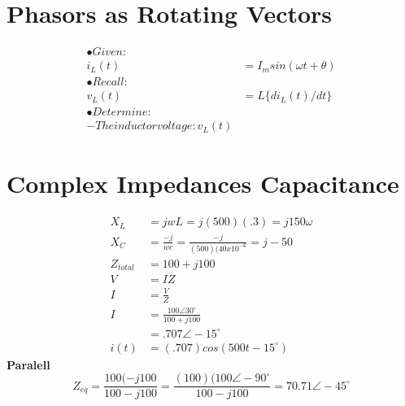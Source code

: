 \documentclass[10pt,a4paper]{article}
\begin{document}
 
\section{Phasors as Rotating Vectors}
\begin{align}
\nonumber
\bullet Given:\\
i_{L}(t)&=I_{m}sin(\omega t + \theta )\\
\nonumber
\bullet Recall:\\
v_{L}(t)&=L\{ di_{L}(t)/dt\}\\
\nonumber
\bullet Determine:\\
\nonumber
-The inductor voltage: v _{L}(t)
\end{align}
\section{Complex Impedances Capacitance}
\begin{align}
X_{L}&=jwL
=j(500)(.3)
=j150\omega\\
X_{C}&=\frac{-j}{wc}
=\frac{-j}{(500)(40x10^{-6}}
=j-50\\
Z_{total}&=100+j100\\
V&=IZ\\
I&=\frac{V}{Z}\\
I&=\frac{100\angle 30^{\circ}}{100+j100}\\
&=.707\angle -15^{\circ}\\
i(t)&=(.707)cos(500t-15^{\circ} )
\end{align}
\textbf{Paralell}
\begin{equation}
Z_{eq}=\frac{100(-j100}{100-j100}=\frac{(100)(100\angle -90^{\circ}}{100-j100}=70.71\angle -45^{\circ}
\end{equation}
\end{document}
